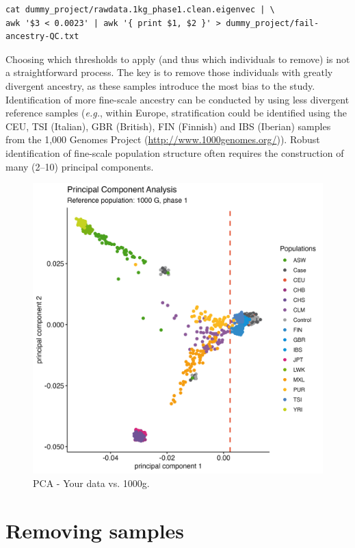 \documentclass[
]{book}
\begin{document}
\begin{lstlisting}
cat dummy_project/rawdata.1kg_phase1.clean.eigenvec | \
awk '$3 < 0.0023' | awk '{ print $1, $2 }' > dummy_project/fail-ancestry-QC.txt
\end{lstlisting}

Choosing which thresholds to apply (and thus which individuals to remove) is not a straightforward process. The key is to remove those individuals with greatly divergent ancestry, as these samples introduce the most bias to the study. Identification of more fine-scale ancestry can be conducted by using less divergent reference samples (\emph{e.g.}, within Europe, stratification could be identified using the CEU, TSI (Italian), GBR (British), FIN (Finnish) and IBS (Iberian) samples from the 1,000 Genomes Project (\url{http://www.1000genomes.org/})). Robust identification of fine-scale population structure often requires the construction of many (2--10) principal components.

\begin{figure}[H]

{\centering \includegraphics[width=0.85\linewidth]{img/_gwas_dummy/gwas-qc-pca-1000g} 

}

\caption{PCA - Your data vs. 1000g.}\label{fig:showpca1kg}
\end{figure}

\hypertarget{removing-samples}{%
\section{Removing samples}\label{removing-samples}}
\end{document}
